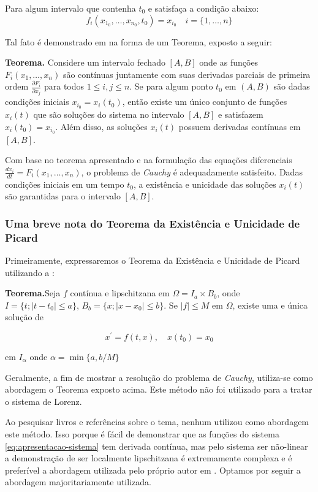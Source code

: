 \documentclass[12pt, a4paper]{article}
\begin{document}
Para algum intervalo que contenha $t_0$ e satisfaça a condição abaixo:
\begin{equation*}
    f_i(x_{1_0}, \ldots, x_{n_0}, t_0) = x_{i_0} \quad i = \{1, \ldots,
    n\}
\end{equation*}

Tal fato é demonstrado em \cite{ford1933} na forma de um Teorema, exposto a
seguir:

\textbf{Teorema.} Considere um intervalo fechado $[A, B]$ onde as funções
$F_i(x_1, \ldots, x_n)$ são contínuas juntamente com suas derivadas parciais de
primeira ordem $\frac{\partial F_i}{\partial x_j}$ para todos $1 \leq i,j \leq
    n$. Se para algum ponto $t_0$ em $(A, B)$ são dadas condições iniciais
$x_{i_0}
    = x_i(t_0)$, então existe um único conjunto de funções $x_i(t)$ que são
soluções do sistema no intervalo $[A, B]$ e satisfazem $x_i(t_0) = x_{i_0}$.
Além disso, as soluções $x_i(t)$ possuem derivadas contínuas em $[A, B]$.

Com base no teorema apresentado e na formulação das equações diferenciais
$\frac{dx_i}{dt} = F_i(x_1, \ldots, x_n)$, o problema de \textit{Cauchy} é
adequadamente satisfeito. Dadas condições iniciais em um tempo $t_0$, a
existência e unicidade das soluções $x_i(t)$ são garantidas para o intervalo
$[A, B]$.

\subsubsection{Uma breve nota do Teorema da Existência e Unicidade de
    Picard}
Primeiramente, expressaremos o Teorema da Existência e Unicidade de Picard
utilizando a \cite{sotomayor1979}:

\textbf{Teorema.}Seja $f$ contínua e lipschitzana em $\Omega = I_a \times
    B_b$, onde $I = \{t; \left|t - t_0 \right| \leq a\}$, $B_b = \{x; \left|x -
    x_0
    \right| \leq b\}$. Se $|f| \leq M$ em $\Omega$, existe uma e única solução
de

\begin{equation*}
    x^\prime = f(t, x), \quad x(t_0) = x_0
\end{equation*}

em $I_\alpha$ onde $\alpha = \min \{a, b/M\}$

Geralmente, a fim de mostrar a resolução do problema de \textit{Cauchy},
utiliza-se como abordagem o Teorema exposto acima. Este método não foi
utilizado para a tratar o sistema de Lorenz.

Ao pesquisar livros e referências sobre o tema, nenhum utilizou como
abordagem este método. Isso porque é fácil de demonstrar que as funções do
sistema \eqref{eq:apresentacao-sistema} tem derivada contínua, mas pelo sistema
ser não-linear a demonstração de ser localmente lipschitzana é extremamente
complexa e é preferível a abordagem utilizada pelo próprio autor em
\cite{Lorenz1963}. Optamos por seguir a abordagem majoritariamente utilizada.
\end{document}

